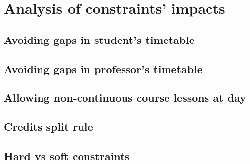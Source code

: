 \chapter{Analysis of constraints' impacts}
\label{chap:constranalysis}


\newpage

\section{Avoiding gaps in student's timetable}



\section{Avoiding gaps in professor's timetable}



\section{Allowing non-continuous course lessons at day}



\section{Credits split rule}



\section{Hard vs soft constraints}
